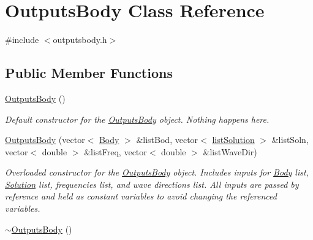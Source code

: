 \hypertarget{class_outputs_body}{\section{Outputs\-Body Class Reference}
\label{class_outputs_body}
}


{\ttfamily \#include $<$outputsbody.\-h$>$}

\subsection*{Public Member Functions}
\begin{DoxyCompactItemize}
\item 
\hypertarget{class_outputs_body_a6898483a0919f9bb9cd82e3036a59a14}{\hyperlink{class_outputs_body_a6898483a0919f9bb9cd82e3036a59a14}{Outputs\-Body} ()}\label{class_outputs_body_a6898483a0919f9bb9cd82e3036a59a14}

\begin{DoxyCompactList}\small\item\em Default constructor for the \hyperlink{class_outputs_body}{Outputs\-Body} object. Nothing happens here. \end{DoxyCompactList}\item 
\hyperlink{class_outputs_body_ab60bf40c068f1dc57e7fc34ef289d297}{Outputs\-Body} (vector$<$ \hyperlink{class_body}{Body} $>$ \&list\-Bod, vector$<$ \hyperlink{classlist_solution}{list\-Solution} $>$ \&list\-Soln, vector$<$ double $>$ \&list\-Freq, vector$<$ double $>$ \&list\-Wave\-Dir)
\begin{DoxyCompactList}\small\item\em Overloaded constructor for the \hyperlink{class_outputs_body}{Outputs\-Body} object. Includes inputs for \hyperlink{class_body}{Body} list, \hyperlink{class_solution}{Solution} list, frequencies list, and wave directions list. All inputs are passed by reference and held as constant variables to avoid changing the referenced variables. \end{DoxyCompactList}\item 
\hypertarget{class_outputs_body_a9ec0c3721f511168c425b792bdaf2d62}{\hyperlink{class_outputs_body_a9ec0c3721f511168c425b792bdaf2d62}{$\sim$\-Outputs\-Body} ()}\label{class_outputs_body_a9ec0c3721f511168c425b792bdaf2d62}


\end{DoxyCompactItemize}
